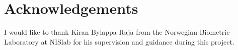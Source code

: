 \section*{Acknowledgements}
I would like to thank Kiran Bylappa Raja from the Norwegian Biometric Laboratory
at NISlab for his supervision and guidance during this project.
